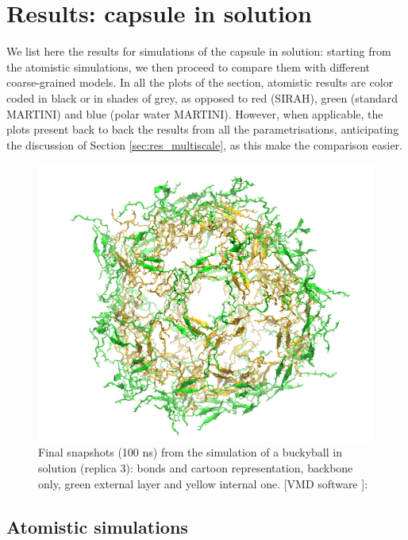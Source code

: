 \section{Results: capsule in solution} \label{sec:results_cap}
We list here the results for simulations of the capsule in solution: starting from the atomistic simulations, we then proceed to compare them with different coarse-grained models. In all the plots of the section, atomistic results are color coded in black or in shades of grey, as opposed to red (SIRAH), green (standard MARTINI) and blue (polar water MARTINI). However, when applicable, the plots present back to back the results from all the parametrisations, anticipating the discussion of Section \ref{sec:res_multiscale}, as this make the comparison easier.

\begin{figure}[t]
\centering
\includegraphics[width=0.5\linewidth]{3results_capsule/pics/staR3_render}
\caption[Atomistic run of buckyball in solution: final configuration]{Final snapshots (100 ns) from the simulation of a buckyball in solution (replica 3): bonds and cartoon representation, backbone only, green external layer and yellow internal one. [VMD software \citet{HUMP96}]: }
\label{fig:BTI_snap}
\end{figure}

\subsection{Atomistic simulations}

